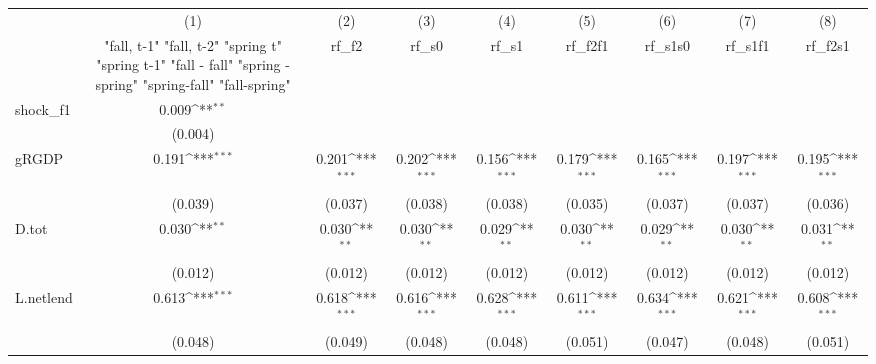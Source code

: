{
\def\sym#1{\ifmmode^{#1}\else\(^{#1}\)\fi}
\begin{tabular}{l*{8}{c}}
\toprule
            &\multicolumn{1}{c}{(1)}&\multicolumn{1}{c}{(2)}&\multicolumn{1}{c}{(3)}&\multicolumn{1}{c}{(4)}&\multicolumn{1}{c}{(5)}&\multicolumn{1}{c}{(6)}&\multicolumn{1}{c}{(7)}&\multicolumn{1}{c}{(8)}\\
            &\multicolumn{1}{c}{  "fall, t-1" "fall, t-2" "spring t" "spring t-1"  "fall - fall" "spring - spring" "spring-fall" "fall-spring" }&\multicolumn{1}{c}{rf\_f2}&\multicolumn{1}{c}{rf\_s0}&\multicolumn{1}{c}{rf\_s1}&\multicolumn{1}{c}{rf\_f2f1}&\multicolumn{1}{c}{rf\_s1s0}&\multicolumn{1}{c}{rf\_s1f1}&\multicolumn{1}{c}{rf\_f2s1}\\
\midrule
shock\_f1    &       0.009\sym{**} &                     &                     &                     &                     &                     &                     &                     \\
            &     (0.004)         &                     &                     &                     &                     &                     &                     &                     \\
\addlinespace
gRGDP       &       0.191\sym{***}&       0.201\sym{***}&       0.202\sym{***}&       0.156\sym{***}&       0.179\sym{***}&       0.165\sym{***}&       0.197\sym{***}&       0.195\sym{***}\\
            &     (0.039)         &     (0.037)         &     (0.038)         &     (0.038)         &     (0.035)         &     (0.037)         &     (0.037)         &     (0.036)         \\
\addlinespace
D.tot       &       0.030\sym{**} &       0.030\sym{**} &       0.030\sym{**} &       0.029\sym{**} &       0.030\sym{**} &       0.029\sym{**} &       0.030\sym{**} &       0.031\sym{**} \\
            &     (0.012)         &     (0.012)         &     (0.012)         &     (0.012)         &     (0.012)         &     (0.012)         &     (0.012)         &     (0.012)         \\
\addlinespace
L.netlend   &       0.613\sym{***}&       0.618\sym{***}&       0.616\sym{***}&       0.628\sym{***}&       0.611\sym{***}&       0.634\sym{***}&       0.621\sym{***}&       0.608\sym{***}\\
            &     (0.048)         &     (0.049)         &     (0.048)         &     (0.048)         &     (0.051)         &     (0.047)         &     (0.048)         &     (0.051)         \\

\end{tabular}}
